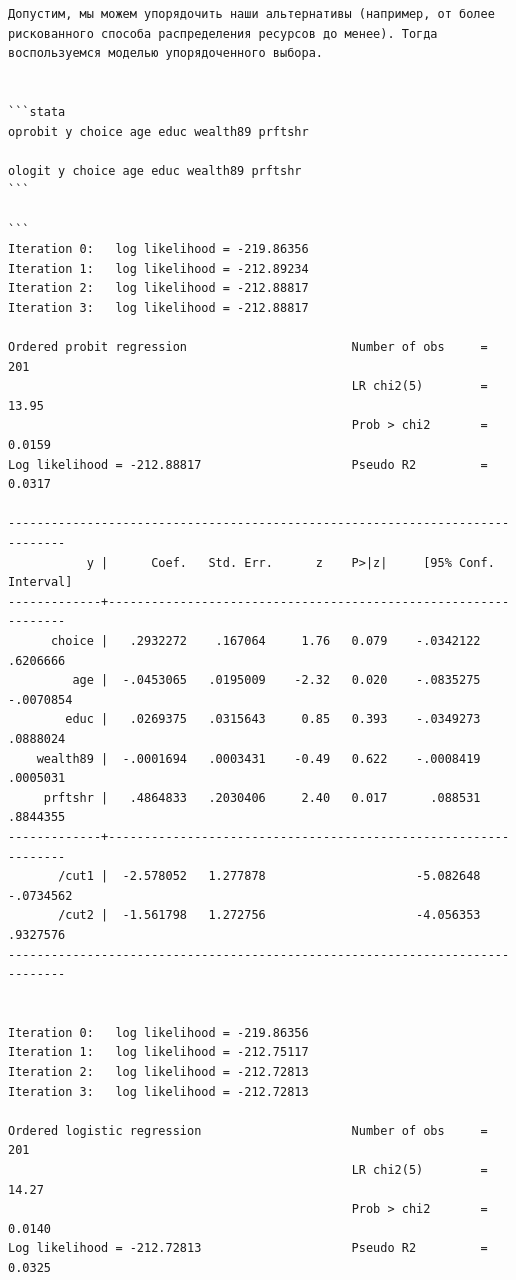 \documentclass[]{book}
\begin{document}
\begin{verbatim}
Допустим, мы можем упорядочить наши альтернативы (например, от более рискованного способа распределения ресурсов до менее). Тогда воспользуемся моделью упорядоченного выбора.


```stata
oprobit y choice age educ wealth89 prftshr

ologit y choice age educ wealth89 prftshr
```

```
Iteration 0:   log likelihood = -219.86356  
Iteration 1:   log likelihood = -212.89234  
Iteration 2:   log likelihood = -212.88817  
Iteration 3:   log likelihood = -212.88817  

Ordered probit regression                       Number of obs     =        201
                                                LR chi2(5)        =      13.95
                                                Prob > chi2       =     0.0159
Log likelihood = -212.88817                     Pseudo R2         =     0.0317

------------------------------------------------------------------------------
           y |      Coef.   Std. Err.      z    P>|z|     [95% Conf. Interval]
-------------+----------------------------------------------------------------
      choice |   .2932272    .167064     1.76   0.079    -.0342122    .6206666
         age |  -.0453065   .0195009    -2.32   0.020    -.0835275   -.0070854
        educ |   .0269375   .0315643     0.85   0.393    -.0349273    .0888024
    wealth89 |  -.0001694   .0003431    -0.49   0.622    -.0008419    .0005031
     prftshr |   .4864833   .2030406     2.40   0.017      .088531    .8844355
-------------+----------------------------------------------------------------
       /cut1 |  -2.578052   1.277878                     -5.082648   -.0734562
       /cut2 |  -1.561798   1.272756                     -4.056353    .9327576
------------------------------------------------------------------------------


Iteration 0:   log likelihood = -219.86356  
Iteration 1:   log likelihood = -212.75117  
Iteration 2:   log likelihood = -212.72813  
Iteration 3:   log likelihood = -212.72813  

Ordered logistic regression                     Number of obs     =        201
                                                LR chi2(5)        =      14.27
                                                Prob > chi2       =     0.0140
Log likelihood = -212.72813                     Pseudo R2         =     0.0325


\end{verbatim}
\end{document}
